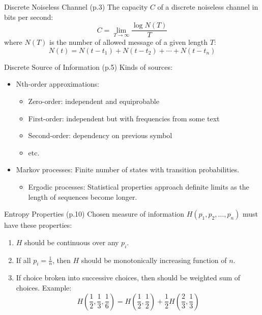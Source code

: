 \documentclass{beamer}
\begin{document}
  \begin{frame}{Discrete Noiseless Channel \small (p.3)}
    The capacity $C$ of a discrete noiseless channel in bits per second:
    \begin{equation}
      C = \lim_{T \rightarrow \infty} \frac{\log N(T)}{T}
    \end{equation}
    where $N(T)$ is the number of allowed message of a given length $T$:
    \begin{equation}
      N(t) = N(t - t_1) + N(t - t_2) + \cdots + N(t - t_n)
    \end{equation}
  \end{frame}

  \begin{frame}{Discrete Source of Information \small (p.5)}
    Kinds of sources:
    \begin{itemize}
      \item Nth-order approximations:
      \begin{itemize}
        \item Zero-order: independent and equiprobable
        \item First-order: independent but with frequencies from some text
        \item Second-order: dependency on previous symbol
        \item etc.
      \end{itemize}
      \item Markov processes: Finite number of states with transition probabilities.
      \begin{itemize}
        \item Ergodic processes: Statistical properties approach definite
          limits as the length of sequences become longer.
      \end{itemize}
    \end{itemize}
  \end{frame}

  \begin{frame}{Entropy Properties \small (p.10)}
    Chosen measure of information $H(p_1, p_2, \ldots, p_n)$ must have these
    properties:
    \begin{enumerate}
      \item $H$ should be continuous over any $p_i$.
      \item If all $p_i = \frac{1}{n}$, then $H$ should be monotonically
        increasing function of $n$.
      \item If choice broken into successive choices, then should be weighted
        sum of choices.  Example:
        \begin{equation}
          H\left(\frac{1}{2}, \frac{1}{3}, \frac{1}{6}\right) = H\left(\frac{1}{2},
          \frac{1}{2}\right) + \frac{1}{2} H\left(\frac{2}{3}, \frac{1}{3}\right)
        \end{equation}
    \end{enumerate}
  \end{frame}
\end{document}
